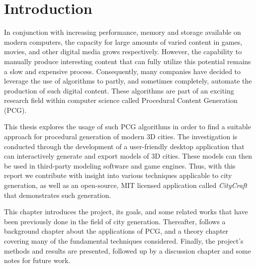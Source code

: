 \chapter{Introduction}



In conjunction with increasing performance, memory and storage available on modern computers, the capacity for large amounts of varied content in games, movies, and other digital media grows respectively.
However, the capability to manually produce interesting content that can fully utilize this potential remains a slow and expensive process.
Consequently, many companies have decided to leverage the use of algorithms to partly, and sometimes completely, automate the production of such digital content.
These algorithms are part of an exciting research field within computer science called Procedural Content Generation (PCG).

This thesis explores the usage of such PCG algorithms in order to find a suitable approach for procedural generation of modern 3D cities.
The investigation is conducted through the development of a user-friendly desktop application that can interactively generate and export models of 3D cities.
These models can then be used in third-party modeling software and game engines.
Thus, with this report we contribute with insight into various techniques applicable to city generation, as well as an open-source, MIT licensed application called \textit{CityCraft} that demonstrates such generation.

This chapter introduces the project, its goals, and some related works that have been previously done in the field of city generation.
Thereafter, follows a background chapter about the applications of PCG, and a theory chapter covering many of the fundamental techniques considered.
Finally, the project's methods and results are presented, followed up by a discussion chapter and some notes for future work.

\newpage




